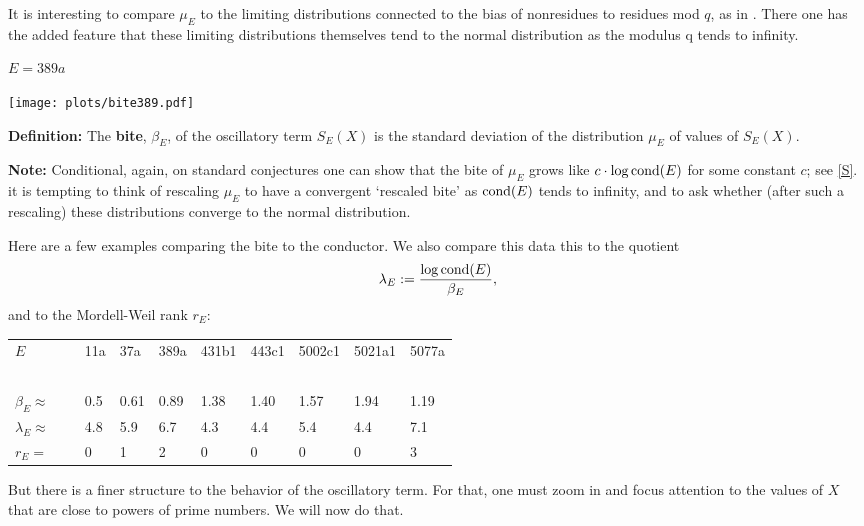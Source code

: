\documentclass[11pt]{article}
\theoremstyle{plain}
\theoremstyle{definition}
\newtheorem{project}[theorem]{Project}
\numberwithin{equation}{section}
\numberwithin{figure}{section}
\numberwithin{table}{section}
\def\SS{\mathcal{S}}
\begin{document}
     It is interesting  to compare $\mu_E$ to the limiting distributions connected to the bias of nonresidues to residues mod $q$, as in \cite{R-S}. There one has the added feature that these limiting distributions themselves tend to the normal distribution as the modulus q tends to infinity.
  \centerline{ $E = 389a$}
  \vskip10pt
\hskip100pt \texttt{[image: plots/bite389.pdf]}


   {\bf Definition:}  The {\bf bite}, $\beta_E$, of the oscillatory term $S_E(X)$ is the standard deviation of the   distribution $\mu_E$ of values of $S_E(X)$.

    {\bf  Note: } Conditional, again,  on standard conjectures  one can show that the bite of $\mu_E$  grows like $c\cdot \log {\rm cond}(E)$ for some constant $c$; see \ref{S}. it is tempting to think of rescaling $\mu_E$ to have a convergent `rescaled bite' as ${\rm cond}(E)$ tends to infinity, and to ask whether (after such a rescaling) these distributions converge to the normal distribution.

 Here are a few examples comparing the bite to the conductor. We also compare this data this to the quotient $$\lambda_E:={\frac{ \log {\rm cond}(E)}{\beta_E}},$$ and to the Mordell-Weil rank $r_E$:



  \begin{tabular}{llllllllll}
  $E$   &\ & 11a & 37a & 389a & 431b1 & 443c1 & 5002c1 & 5021a1 & 5077a\\
\  &\ &\  &\  &\  &\ &\ &\ &\ &\ \\
  $\beta_E \approx $  &\ & 0.5 & 0.61 & 0.89 & 1.38 & 1.40 & 1.57 & 1.94 & 1.19\\
  $\lambda_E  \approx$  &\ & 4.8 & 5.9 & 6.7 & 4.3 & 4.4 & 5.4 & 4.4 & 7.1\\
  $r_E =$   &\ & 0 & 1 & 2 & 0 & 0 & 0 & 0 & 3 \end{tabular}
\vskip10pt

  But there is a finer structure to the behavior of the oscillatory term. For that, one must zoom in and focus attention to the values of $X$ that are close to powers of prime numbers. We will now do that.
\end{document}
